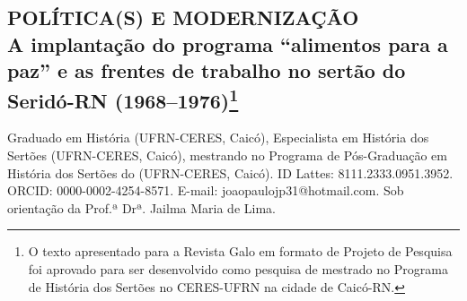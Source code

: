\begin{refsection}
    \renewcommand{\thefigure}{\arabic{figure}}

    \chapter[Política(s) e modernização: {\itshape a implantação do programa “alimentos para a paz” e as frentes de trabalho no sertão do Seridó-RN (1968--1976)}]{POLÍTICA(S) E MODERNIZAÇÃO\\A implantação do programa ``alimentos para a paz'' e as frentes de trabalho no sertão do Seridó-RN (1968--1976)\footnote{O texto apresentado para a Revista Galo em formato de Projeto de Pesquisa foi aprovado para ser desenvolvido como pesquisa de mestrado no Programa de História dos Sertões no CERES-UFRN na cidade de Caicó-RN.}}
    \label{chap:politicamoder}
    
    {Graduado em História (UFRN-CERES, Caicó), Especialista em História dos Sertões
    (UFRN-CERES, Caicó), mestrando no Programa de Pós-Graduação em História dos
    Sertões do (UFRN-CERES, Caicó). ID Lattes: 8111.2333.0951.3952.
    ORCID: 0000-0002-4254-8571. E-mail: joaopaulojp31@hotmail.com.
    Sob orientação da Prof.ª Drª. Jailma Maria de Lima.}


\end{refsection}
